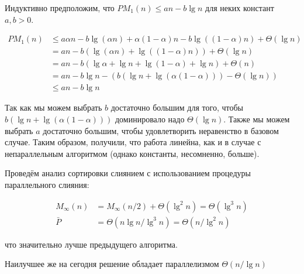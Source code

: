 \documentclass[a4paper,11pt]{article}
\begin{document}
Индуктивно предположим, что $PM_1(n) \leqslant an - b\lg n$ для неких констант
$a, b > 0$.

\begin{align*}
  PM_1(n) &\leqslant a\alpha n - b \lg (\alpha n) + \alpha (1 - \alpha) n - b
  \lg ((1 - \alpha) n) + \Theta(\lg n) \\
  &= an - b(\lg(\alpha n) + \lg ((1 - \alpha) n)) + \Theta(\lg n) \\
  &= an - b(\lg \alpha + \lg n + \lg(1- \alpha) + \lg n) + \Theta(n) \\
  &= an - b\lg n - (b(\lg n + \lg(\alpha(1 - \alpha))) - \Theta(\lg n)) \\
  &\leqslant an - b \lg n
\end{align*}

Так как мы можем выбрать $b$ достаточно большим для того, чтобы $b(\lg n +
\lg(\alpha(1 - \alpha)))$ доминировало надо $\Theta(\lg n)$. Также мы можем
выбрать $a$ достаточно большим, чтобы удовлетворить неравенство в базовом
случае. Таким образом, получили, что работа линейна, как и в случае с
непараллельным алгоритмом (однако константы, несомненно, больше).

Проведём анализ сортировки слиянием с использованием процедуры параллельного
слияния:

\begin{align*}
  M_{\infty}(n) &= M_{\infty}(n/2) + \Theta(\lg^2 n) = \Theta(\lg^3 n) \\
  \bar{P} &= \Theta(n \lg n / \lg^3 n) = \Theta(n / \lg^2 n)
\end{align*}

что значительно лучше предыдущего алгоритма.

Наилучшее же на сегодня решение обладает параллелизмом $\Theta(n / \lg n)$
\end{document}
